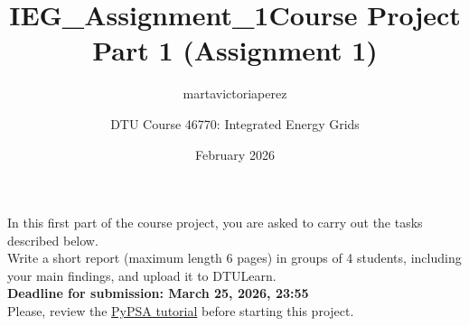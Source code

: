 \documentclass[10pt]{article}
\title{IEG_Assignment_1}
\author{martavictoriaperez }
\date{February 2026}
\begin{document}
 
\title{\textbf{Course Project Part 1 (Assignment 1)}}
\author{DTU Course 46770: Integrated Energy Grids}
\maketitle

In this first part of the course project, you are asked to carry out the tasks described below. \\

Write a short report (maximum length 6 pages) in groups of 4 students, including your main findings, and upload it to DTULearn. \\

\textbf{Deadline for submission: March 25, 2026, 23:55} \\


Please, review the \href{https://aleks-g.github.io/integrated-energy-grids/intro-pypsa.html}{PyPSA tutorial} before starting this project. \\
\end{document}
